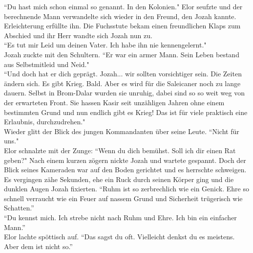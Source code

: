 ``Du hast mich schon einmal so genannt. In den Kolonien."
Elor seufzte und der berechnende Mann verwandelte sich wieder in den Freund, den Jozah kannte. 
Erleichterung erfüllte ihn. Die Fuchsstute bekam einen freundlichen Klaps zum Abschied und ihr Herr 
wandte sich Jozah nun zu. \\
``Es tut mir Leid um deinen Vater. Ich habe ihn nie kennengelernt."\\
Jozah zuckte mit den Schultern. ``Er war ein armer Mann. Sein Leben bestand aus Selbstmitleid und 
Neid."\\
``Und doch hat er dich geprägt. Jozah... wir sollten vorsichtiger sein. Die Zeiten ändern sich. Es 
gibt Krieg. Bald. Aber es wird für die Saleicaner noch zu lange dauern. Selbst in Brom-Dalar wurden 
sie unruhig, dabei sind so so weit weg von der erwarteten Front. Sie hassen Kasir seit unzähligen 
Jahren ohne einem bestimmten Grund und nun endlich gibt es Krieg! Das ist für viele praktisch eine 
Erlaubnis, durchzudrehen."\\
Wieder glitt der Blick des jungen Kommandanten über seine Leute. ``Nicht für uns."\\
Elor schnalzte mit der Zunge: ``Wenn du dich bemühst. Soll ich dir einen Rat geben?"
Nach einem kurzen zögern nickte Jozah und wartete gespannt. Doch der Blick seines Kameraden war auf 
den Boden gerichtet und es herrschte schweigen. Es vergingen zähe Sekunden, ehe ein Ruck durch 
seinen Körper ging und die dunklen Augen Jozah fixierten. ``Ruhm ist so zerbrechlich wie ein 
Genick. Ehre so schnell verraucht wie ein Feuer auf nassem Grund und Sicherheit trügerisch wie 
Schatten.''\\
``Du kennst mich. Ich strebe nicht nach Ruhm und Ehre. Ich bin ein einfacher Mann.''\\
Elor lachte spöttisch auf. ``Das sagst du oft. Vielleicht denkst du es meistens. Aber dem ist 
nicht so.''\\




